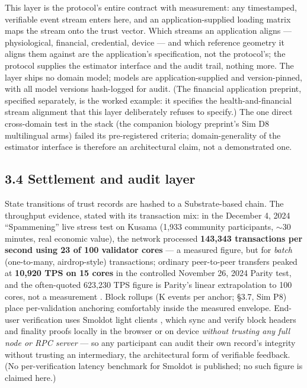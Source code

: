 \documentclass[11pt,twocolumn]{article}
\begin{document}
This layer is the protocol's entire contract with measurement: any
timestamped, verifiable event stream enters here, and an
application-supplied loading matrix maps the stream onto the trust
vector. Which streams an application aligns --- physiological,
financial, credential, device --- and which reference geometry it aligns
them against are the application's specification, not the protocol's;
the protocol supplies the estimator interface and the audit trail,
nothing more. The layer ships no domain model; models are
application-supplied and version-pinned, with all model versions
hash-logged for audit. (The financial application preprint, specified separately, is the worked example: it specifies the health-and-financial stream alignment that this layer
deliberately refuses to specify.) The one direct cross-domain test in
the stack (the companion biology preprint's Sim D8 multilingual arms) failed its pre-registered
criteria; domain-generality of the estimator interface is therefore an
architectural claim, not a demonstrated one.

\subsection*{3.4 Settlement and audit
layer}

State transitions of trust records are hashed to a Substrate-based
chain. The throughput evidence, stated with its transaction mix: in the
December 4, 2024 ``Spammening'' live stress test on Kusama (1,933
community participants, $\sim$30 minutes, real economic value),
the network processed \textbf{143,343 transactions per second using 23
of 100 validator cores} --- a measured figure, but for \emph{batch}
(one-to-many, airdrop-style) transactions; ordinary peer-to-peer
transfers peaked at \textbf{10,920 TPS on 15 cores} in the controlled
November 26, 2024 Parity test, and the often-quoted 623,230 TPS figure
is Parity's linear extrapolation to 100 cores, not a measurement
\citep{spammening2024}. Block rollups (K events per anchor; §3.7, Sim
P8) place per-validation anchoring comfortably inside the measured
envelope. End-user verification uses Smoldot light clients
\citep{smoldot2026}, which sync and verify block headers and finality
proofs locally in the browser or on device \emph{without trusting any
full node or RPC server} --- so any participant can audit their own
record's integrity without trusting an intermediary, the architectural
form of verifiable feedback. (No per-verification latency benchmark for Smoldot is published; no such figure is claimed here.)
\end{document}
